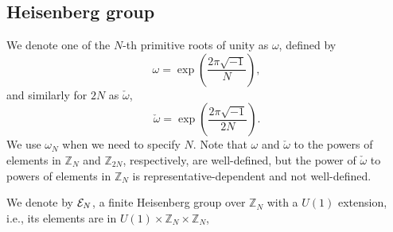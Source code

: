 \documentclass[12pt]{iopart}
\begin{document}
\subsection{\label{dblcol}Heisenberg group}
We denote one of the \(N\)-th primitive roots of unity as \(\omega\), defined by
\begin{equation}
\omega=\exp\left(\frac{2\pi\sqrt{-1}}N\right),
\end{equation}
and similarly for \(2N\) as \(\check\omega\),
\begin{equation}
\check\omega=\exp\left(\frac{2\pi\sqrt{-1}}{2N}\right).
\end{equation}
%
We use \(\omega_N\) when we need to specify \(N\).
%
Note that \(\omega\) and \(\check\omega\) to the powers of elements in \(\mathbb Z_N\) and \(\mathbb Z_{2N}\), respectively,
are well-defined, but the power of \(\check\omega\) to powers of elements in \(\mathbb Z_N\) is representative-dependent
and not well-defined.

We denote by \({\cal E}_N\), a finite Heisenberg group over \(\mathbb Z_N\)
with a \(U(1)\) extension,
i.e., its elements are in \(U(1)\times\mathbb Z_N\times\mathbb Z_N\),
\end{document}
